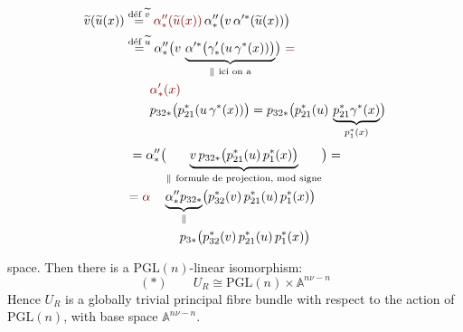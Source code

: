 \[
\begin{aligned}
\widetilde v(\widetilde u(x))
&\overset{\text{déf }\widetilde v}{=}
\deleted{\unsure{\alpha''_*(\widetilde u(x))}}\,
\alpha''_*\bigl(v\,\alpha'^*(\widetilde u(x))\bigr)\\
&\overset{\text{déf }\widetilde u}{=}
\alpha''_*\bigl(v\,\underbrace{\alpha'^*\bigl(\gamma'_*(u\,\gamma^*(x))\bigr)}
_{\Vert\ \text{ici on a}}\bigr)\ \deleted{\unsure{=}}\\
&\hspace{2em}\deleted{\unsure{\alpha'_*(x)}}\\
&\hspace{2em}p_{32*}\bigl(p_{21}^*(u\,\gamma^*(x))\bigr)
=p_{32*}\bigl(p_{21}^*(u)\,\underbrace{p_{21}^*\gamma^*(x)}_{p_1^*(x)}\bigr)
\end{aligned}
\]
\[
\begin{aligned}
&=\alpha''_*\bigl(\underbrace{v\,p_{32*}\bigl(p_{21}^*(u)\,p_1^*(x)\bigr)}
_{\Vert\ \text{formule de projection, }\uline{\text{mod signe}}}\bigr)=\\
&\deleted{=\unsure{\alpha}}\quad
\underbrace{\alpha''_*p_{32*}}_{\Vert}\bigl(p_{32}^*(v)\,p_{21}^*(u)\,p_1^*(x)\bigr)\\
&\hspace{4em}p_{3*}\bigl(p_{32}^*(v)\,p_{21}^*(u)\,p_1^*(x)\bigr)
\end{aligned}
\]


space. Then there is a $\mathrm{PGL}(n)$-linear isomorphism:
\[
(*)\qquad U_R\cong\mathrm{PGL}(n)\times\mathbb{A}^{n\nu-n}
\]
Hence $U_R$ is a globally trivial principal fibre bundle with respect to the action of $\mathrm{PGL}(n)$, with base space $\mathbb{A}^{n\nu-n}$.

